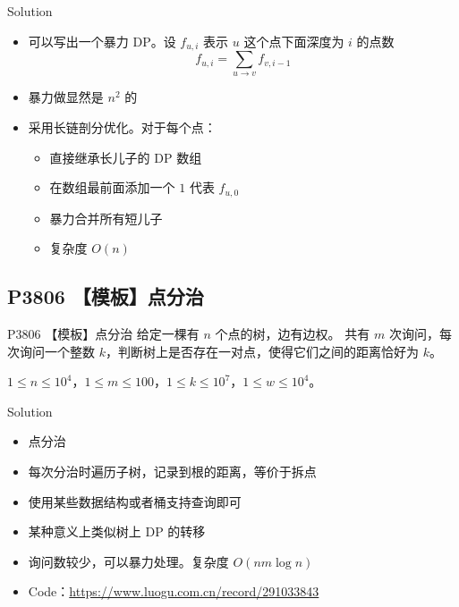 ﻿\documentclass[aspectratio=169]{ctexbeamer}
\begin{document}
\begin{frame}{Solution}
    \begin{itemize}
        \item 可以写出一个暴力 DP。设 $f_{u,i}$ 表示 $u$ 这个点下面深度为 $i$ 的点数
        $$
            f_{u,i}={\sum_{u\to v}}f_{v,i-1}
        $$
        \item 暴力做显然是 $n^2$ 的
        \item 采用长链剖分优化。对于每个点：
        \begin{itemize}
            \item 直接继承长儿子的 DP 数组
            \item 在数组最前面添加一个 $ 1 $ 代表 $f_{u,0}$
            \item 暴力合并所有短儿子
            \item 复杂度 $O(n)$
        \end{itemize}
    \end{itemize}
\end{frame}

\subsection{P3806 【模板】点分治}

\begin{frame}{P3806 【模板】点分治}
    给定一棵有 $n$ 个点的树，边有边权。
    共有 $m$ 次询问，每次询问一个整数 $k$，判断树上是否存在一对点，使得它们之间的距离恰好为 $k$。

    \medskip
    $1\le n\le 10^4$，$1\le m\le 100$，$1\le k\le 10^7$，$1\le w\le 10^4$。
\end{frame}

\begin{frame}{Solution}
    \begin{itemize}
        \item 点分治
        \item 每次分治时遍历子树，记录到根的距离，等价于拆点
        \item 使用某些数据结构或者桶支持查询即可
        \item 某种意义上类似树上 DP 的转移
        \item 询问数较少，可以暴力处理。复杂度 $O(nm\log n)$
        \item Code：\url{https://www.luogu.com.cn/record/291033843}
    \end{itemize}
\end{frame}
\end{document}
